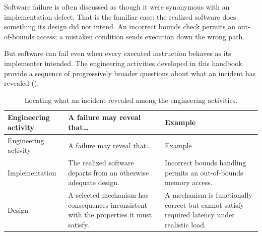 Software failure is often discussed as though it were synonymous with an implementation defect.
That is the familiar case: the realized software does something its design did not intend. An
incorrect bounds check permits an out-of-bounds access; a mistaken condition sends execution down
the wrong path.

But software can fail even when every executed instruction behaves as its implementer intended. The
engineering activities developed in this handbook provide a sequence of progressively broader
questions about what an incident has revealed (\citet{tbl-locating-failure}).

\begin{longtable}[]{@{}
  >{\raggedright\arraybackslash}p{}
  >{\raggedright\arraybackslash}p{}
  >{\raggedright\arraybackslash}p{}@{}}
\caption{Locating what an incident revealed among the engineering activities.}\label{tbl-locating-failure}\tabularnewline
\toprule\noalign{}
\begin{minipage}[b]{\linewidth}\raggedright
Engineering activity
\end{minipage} & \begin{minipage}[b]{\linewidth}\raggedright
A failure may reveal that\ldots{}
\end{minipage} & \begin{minipage}[b]{\linewidth}\raggedright
Example
\end{minipage} \\
\midrule\noalign{}
\endfirsthead
\toprule\noalign{}
\begin{minipage}[b]{\linewidth}\raggedright
Engineering activity
\end{minipage} & \begin{minipage}[b]{\linewidth}\raggedright
A failure may reveal that\ldots{}
\end{minipage} & \begin{minipage}[b]{\linewidth}\raggedright
Example
\end{minipage} \\
\midrule\noalign{}
\endhead
\bottomrule\noalign{}
\endlastfoot
Implementation & The realized software departs from an otherwise adequate design. & Incorrect bounds handling permits an out-of-bounds memory access. \\
Design & A selected mechanism has consequences inconsistent with the properties it must satisfy. & A mechanism is functionally correct but cannot satisfy required latency under realistic load. \\

\end{longtable}
